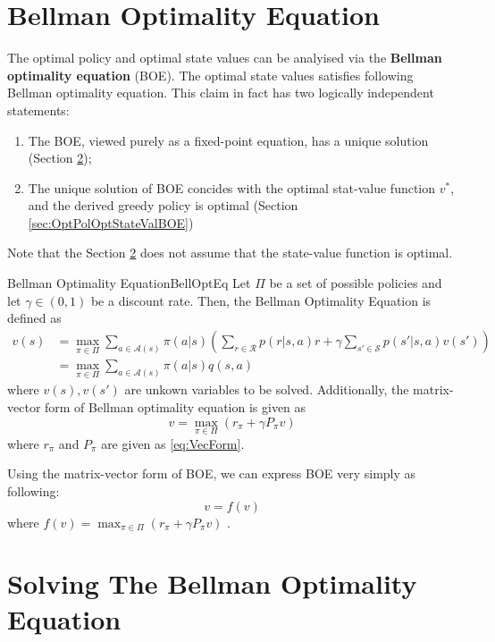 \section{Bellman Optimality Equation}
    The optimal policy and optimal state values can be analyised via the \textbf{Bellman optimality equation} (BOE).
    The optimal state values satisfies following Bellman optimality equation. This claim in fact has two logically independent statements:
    \begin{enumerate}
        \item The BOE, viewed purely as a fixed-point equation, has a unique solution (Section \ref{sec:SolveBellmanOptEq});
        \item The unique solution of BOE concides with the optimal stat-value function $v^*$, and the derived greedy policy is optimal (Section \ref{sec:OptPolOptStateValBOE})
    \end{enumerate}
    Note that the Section \ref{sec:SolveBellmanOptEq} does not assume that the state-value function is optimal.
    \begin{defn}{Bellman Optimality Equation}{BellOptEq}
        Let $\Pi$ be a set of possible policies and let $\gamma \in (0,1)$ be a discount rate. Then, the Bellman Optimality Equation is defined as
        \begin{align}
            v(s) &= \max_{\pi \in \Pi} \sum_{a \in \mathcal{A}(s)}\pi(a|s)\left( \sum_{r \in \mathcal{R}}p(r|s,a)r + \gamma \sum_{s' \in \mathcal{S}}p(s'|s,a)v(s') \right) \\
                 &= \max_{\pi \in \Pi} \sum_{a \in \mathcal{A}(s)}\pi(a|s)q(s,a)
        \end{align}
        where $v(s),v(s')$ are unkown variables to be solved.
        Additionally, the matrix-vector form of Bellman optimality equation is given as
        \begin{equation}
            v = \max_{\pi \in \Pi}(r_\pi + \gamma P_\pi v)
        \end{equation}
        where $r_\pi$ and $P_\pi$ are given as \ref{eq:VecForm}.
    \end{defn}
    Using the matrix-vector form of BOE, we can express BOE very simply as following:
    \begin{equation}
        v = f(v)
    \end{equation}
    where $f(v) = \max_{\pi \in \Pi}(r_\pi + \gamma P_\pi v)$ \label{eq:BOERightHandSide}.
\section{Solving The Bellman Optimality Equation}\label{sec:SolveBellmanOptEq}
